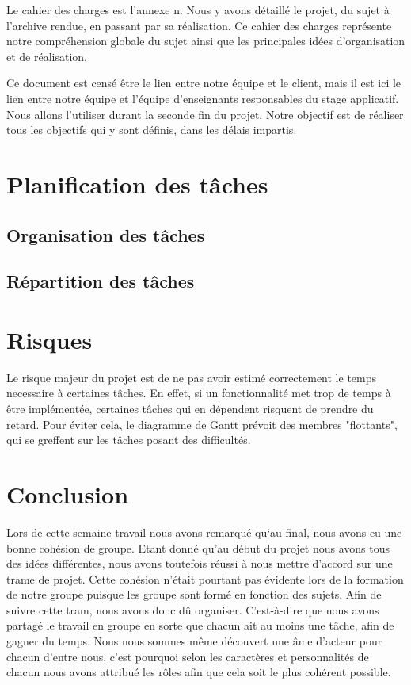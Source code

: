 \documentclass[a4paper,10pt]{article} %
\begin{document}
Le cahier des charges est l'annexe n. Nous y avons détaillé le projet, du sujet à l'archive rendue, en passant par sa réalisation. Ce cahier des charges représente notre compréhension globale du sujet ainsi que les principales idées d'organisation et de réalisation.

Ce document est censé être le lien entre notre équipe et le client, mais il est ici le lien entre notre équipe et l'équipe d'enseignants responsables du stage applicatif. Nous allons l'utiliser durant la seconde fin du projet. Notre objectif est de réaliser tous les objectifs qui y sont définis, dans les délais impartis.

\section{Planification des tâches}

	\subsection{Organisation des tâches}

	\subsection{Répartition des tâches}

\section{Risques}

Le risque majeur du projet est de ne pas avoir estimé correctement le temps necessaire à certaines tâches. En effet, si un fonctionnalité met trop de temps à être implémentée, certaines tâches qui en dépendent risquent de prendre du retard. Pour éviter cela, le diagramme de Gantt prévoit des membres "flottants", qui se greffent sur les tâches posant des difficultés.

\section*{Conclusion}

Lors de cette semaine travail nous avons remarqué qu‘au final, nous avons eu une bonne cohésion de groupe. Etant donné qu’au début du projet nous avons tous des idées différentes, nous avons toutefois réussi à nous mettre d’accord sur une trame de projet. Cette cohésion n’était pourtant pas évidente lors de la formation de notre groupe puisque les groupe sont formé en fonction des sujets. Afin de suivre cette tram, nous avons donc dû organiser. C’est-à-dire que nous avons partagé le travail en groupe en sorte que chacun ait au moins une tâche, afin de gagner du temps. Nous nous sommes même découvert une âme d’acteur pour chacun d’entre nous, c’est pourquoi selon les caractères et personnalités de chacun nous avons attribué les rôles afin que cela soit le plus cohérent possible.
\end{document}
